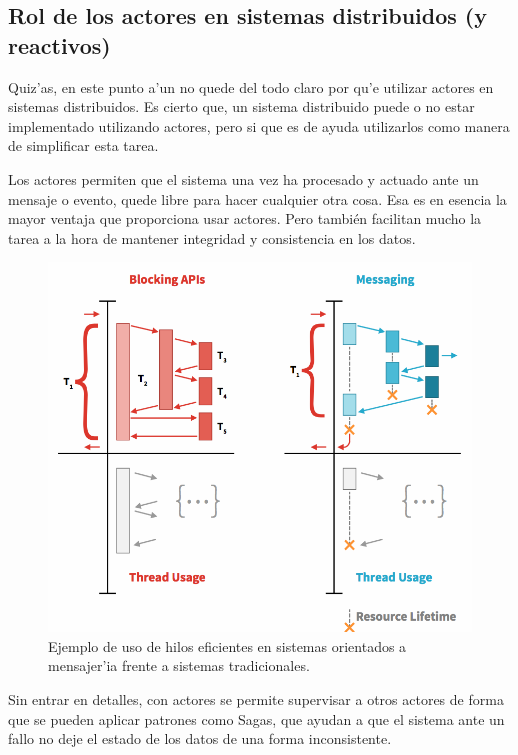\documentclass[12pt]{article}
\begin{document}
\subsection{Rol de los actores en sistemas distribuidos (y reactivos)}
\label{sub:rol de los actores en sistemas distribuidos y reactivos}
Quiz'as, en este punto a'un no quede del todo claro por qu'e utilizar actores en sistemas distribuidos.
Es cierto que, un sistema distribuido puede o no estar implementado utilizando actores, pero
si que es de ayuda utilizarlos como manera de simplificar esta tarea.

Los actores permiten que el sistema una vez ha procesado y actuado ante un mensaje o evento, quede
libre para hacer cualquier otra cosa. Esa es en esencia la mayor ventaja que proporciona usar actores.
Pero también facilitan mucho la tarea a la hora de mantener integridad y consistencia en los datos.

\begin{figure}[h]
\centering
\includegraphics[scale=0.3]{syncvsasync}
\caption{Ejemplo de uso de hilos eficientes en sistemas orientados a mensajer'ia frente a sistemas tradicionales.}
\end{figure}

Sin entrar en detalles, con actores se permite supervisar a otros actores de forma que se pueden
aplicar patrones como Sagas, que ayudan a que el sistema ante un fallo no deje el estado de los datos
de una forma inconsistente.
\end{document}
